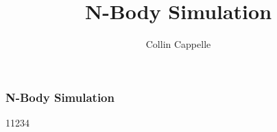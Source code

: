 \documentclass{beamer}
\title{N-Body Simulation}
\author{Collin Cappelle}
\institute{Phys 256}
\begin{document}
 
\frame{\titlepage}
 
\begin{frame}
\frametitle{N-Body Simulation}
11234
\end{frame}
 
\end{document}
